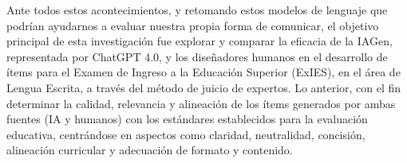 Ante todos estos acontecimientos, y retomando estos modelos de lenguaje
que podrían ayudarnos a evaluar nuestra propia forma de comunicar, el
objetivo principal de esta investigación fue explorar y comparar la
eficacia de la IAGen, representada por ChatGPT 4.0, y los diseñadores
humanos en el desarrollo de ítems para el Examen de Ingreso a la
Educación Superior (ExIES), en el área de Lengua Escrita, a través del
método de juicio de expertos. Lo anterior, con el fin determinar la
calidad, relevancia y alineación de los ítems generados por ambas
fuentes (IA y humanos) con los estándares establecidos para la
evaluación educativa, centrándose en aspectos como claridad,
neutralidad, concisión, alineación curricular y adecuación de formato y
contenido.